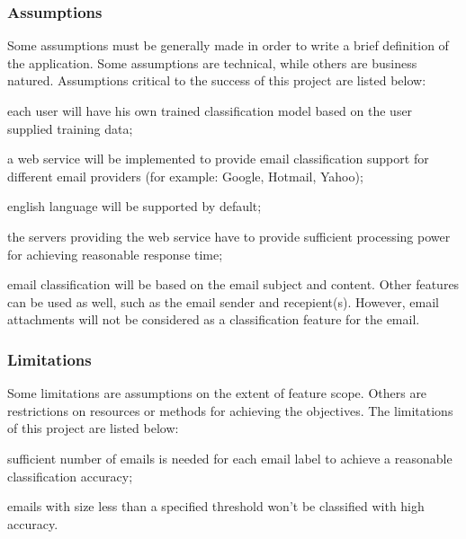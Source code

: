 \subsubsection{Assumptions}
Some assumptions must be generally made in order to write a brief definition 
of the application. Some assumptions are technical, while others are business natured.  Assumptions 
critical to the success of this project are listed below:
\begin{my_itemize}
  \item each user will have his own trained classification model based on the user supplied training data;
  \item a web service will be implemented to provide email classification support for different email 
	providers (for example: Google, Hotmail, Yahoo);
  \item english language will be supported by default;
  \item the servers providing the web service have to provide sufficient 
	processing power for achieving reasonable response time;
  \item email classification will be based on the email subject and content. 
	Other features can be used as well, such as the email sender and recepient(s). 
	However, email attachments will not be considered as a classification feature for the email.
\end{my_itemize}

\subsubsection{Limitations}
Some limitations are assumptions on the extent of feature scope. Others are restrictions on resources 
or methods for achieving the objectives. The limitations of this project are listed below:

\begin{my_itemize}
  \item sufficient number of emails is needed for each email label to achieve 
	a reasonable classification accuracy;
  \item emails with size less than a specified threshold won't be classified with
  high accuracy.
\end{my_itemize}

